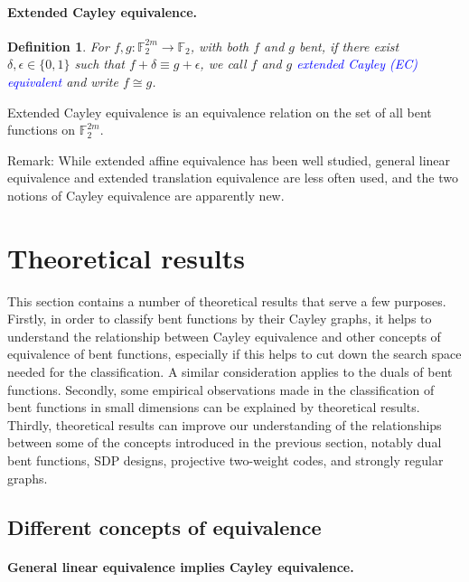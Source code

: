 \documentclass[12pt,a4paper]{article}
\newcommand{\mb}[1]{\mathbb{#1}}
\newcommand{\F}{\mb{F}}
\newcommand{\To}{\rightarrow}
\newcommand{\Emph}[1]{\emph{\textcolor{blue}{#1}}}
\newtheorem{Definition}{Definition}
\begin{document}
\paragraph*{Extended Cayley equivalence.}
\begin{Definition}
For $f, g : \F_2^{2m} \To \F_2$, with both $f$ and $g$ bent,
if there exist $\delta, \epsilon \in \{0,1\}$ such that $f + \delta \equiv g + \epsilon$,
we call $f$ and $g$ \Emph{extended Cayley (EC) equivalent} and write $f \cong g$.
\end{Definition}
Extended Cayley equivalence is an equivalence relation on the set of all bent functions on
$\F_2^{2m}$.

Remark: While extended affine equivalence has been well studied,
general linear equivalence and extended translation equivalence are less often used,
and the two notions of Cayley equivalence are apparently new.

\section{Theoretical results}
\label{sec-Results}

This section contains a number of theoretical results that serve a few purposes.
Firstly, in order to classify bent functions by their Cayley graphs,
it helps to understand the relationship between Cayley equivalence and other concepts of equivalence
of bent functions, especially if this helps to cut down the search space needed for the
classification.
A similar consideration applies to the duals of bent functions.
Secondly, some empirical observations made in the classification of bent functions in small
dimensions can be explained by theoretical results.
Thirdly, theoretical results can improve our understanding of the relationships between
some of the concepts introduced in the previous section, notably dual bent functions, SDP designs,
projective two-weight codes, and strongly regular graphs.

\subsection{Different concepts of equivalence}

\paragraph*{General linear equivalence implies Cayley equivalence.}
\end{document}
